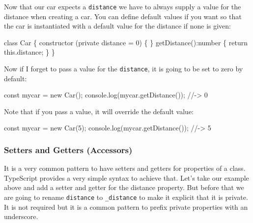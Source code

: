 \documentclass[12pt,]{article}
\newenvironment{Shaded}{}{}
\newcommand{\KeywordTok}[1]{\textcolor[rgb]{0.00,0.00,1.00}{{#1}}}
\newcommand{\DataTypeTok}[1]{{#1}}
\newcommand{\DecValTok}[1]{{#1}}
\newcommand{\CommentTok}[1]{\textcolor[rgb]{0.00,0.50,0.00}{{#1}}}
\newcommand{\FunctionTok}[1]{{#1}}
\newcommand{\NormalTok}[1]{{#1}}
\begin{document}
Now that our car expects a \texttt{distance} we have to always supply a
value for the distance when creating a car. You can define default
values if you want so that the car is instantiated with a default value
for the distance if none is given:

\begin{Shaded}
\begin{Highlighting}[numbers=left,,]
\KeywordTok{class} \NormalTok{Car \{}
  \FunctionTok{constructor} \NormalTok{(}\KeywordTok{private} \NormalTok{distance = }\DecValTok{0}\NormalTok{) \{}
  \NormalTok{\}}
  \FunctionTok{getDistance}\NormalTok{():number \{ }\KeywordTok{return} \KeywordTok{this}\NormalTok{.}\FunctionTok{distance}\NormalTok{; \}}
\NormalTok{\}}
\end{Highlighting}
\end{Shaded}

Now if I forget to pass a value for the \texttt{distance}, it is going
to be set to zero by default:

\begin{Shaded}
\begin{Highlighting}[numbers=left,,]
\DataTypeTok{const} \NormalTok{mycar = }\KeywordTok{new} \FunctionTok{Car}\NormalTok{();}
\NormalTok{console.}\FunctionTok{log}\NormalTok{(mycar.}\FunctionTok{getDistance}\NormalTok{()); }\CommentTok{//-> 0}
\end{Highlighting}
\end{Shaded}

Note that if you pass a value, it will override the default value:

\begin{Shaded}
\begin{Highlighting}[numbers=left,,]
\DataTypeTok{const} \NormalTok{mycar = }\KeywordTok{new} \FunctionTok{Car}\NormalTok{(}\DecValTok{5}\NormalTok{);}
\NormalTok{console.}\FunctionTok{log}\NormalTok{(mycar.}\FunctionTok{getDistance}\NormalTok{()); }\CommentTok{//-> 5}
\end{Highlighting}
\end{Shaded}

\subsubsection{Setters and Getters
(Accessors)}\label{setters-and-getters-accessors}

It is a very common pattern to have setters and getters for properties
of a class. TypeScript provides a very simple syntax to achieve that.
Let's take our example above and add a setter and getter for the
distance property. But before that we are going to rename
\texttt{distance} to \texttt{\_distance} to make it explicit that it is
private. It is not required but it is a common pattern to prefix private
properties with an underscore.
\end{document}
